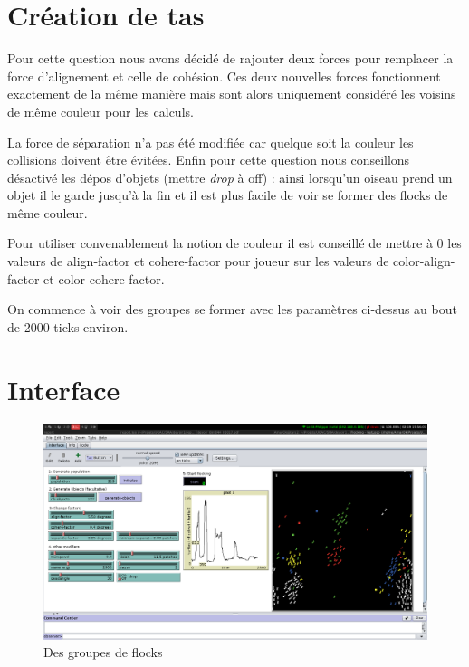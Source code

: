 \documentclass{article}
\begin{document}
\section{Création de tas}

Pour cette question nous avons décidé de rajouter deux forces pour remplacer la force d'alignement et celle de cohésion. Ces deux nouvelles forces fonctionnent exactement de la même manière mais sont alors uniquement considéré les voisins de même couleur pour les calculs.

La force de séparation n'a pas été modifiée car quelque soit la couleur les collisions doivent être évitées. Enfin pour cette question nous conseillons désactivé les dépos d'objets (mettre \emph{drop} à off) : ainsi lorsqu'un oiseau prend un objet il le garde jusqu'à la fin et il est plus facile de voir se former des flocks de même couleur.

Pour utiliser convenablement la notion de couleur il est conseillé de mettre à 0 les valeurs de align-factor et cohere-factor pour joueur sur les valeurs de color-align-factor et color-cohere-factor.

On commence à voir des groupes se former avec les paramètres ci-dessus au bout de 2000 ticks environ.
\section{Interface}
\begin{figure}[h]
	\begin{center}
		\includegraphics[scale=0.3]{img/groups}
		\caption{Des groupes de flocks}
		\label{fig:groups}
	\end{center}
\end{figure}
\end{document}

